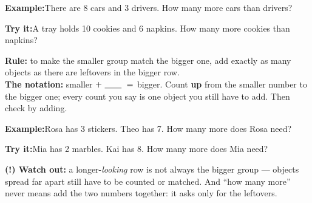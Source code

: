 \documentclass[12pt]{article}
\begin{document}
\begin{examplebox}
\textbf{Example:}\quad There are 8 cars and 3 drivers. How many more cars than drivers?
\end{examplebox}

\begin{tryitbox}
\textbf{Try it:}\quad A tray holds 10 cookies and 6 napkins.
How many more cookies than napkins?\\[2pt]
\end{tryitbox}


\begin{formulabox}
\textbf{Rule:} to make the smaller group match the bigger one, add exactly as many
objects as there are leftovers in the bigger row.\\[3pt]
\textbf{The notation:} smaller $+\ \underline{\hspace{0.7cm}}\ =$ bigger.
Count \textbf{up} from the smaller number to the bigger one; every count you say
is one object you still have to add. Then check by adding.
\end{formulabox}

\begin{examplebox}
\textbf{Example:}\quad Rosa has 3 stickers. Theo has 7. How many more does Rosa need?
\end{examplebox}

\begin{tryitbox}
\textbf{Try it:}\quad Mia has 2 marbles. Kai has 8. How many more does Mia need?\\[2pt]
\end{tryitbox}

\begin{watchoutbox}
\textbf{(!) Watch out:} a longer-\emph{looking} row is not always the bigger group ---
objects spread far apart still have to be counted or matched. And ``how many more''
never means add the two numbers together: it asks only for the leftovers.
\end{watchoutbox}
\end{document}
